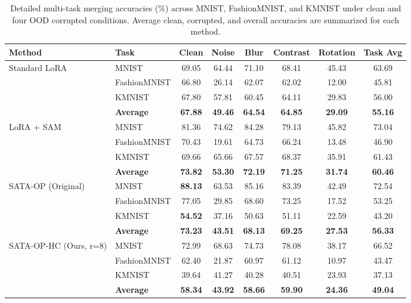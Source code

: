 \documentclass{article}
\theoremstyle{plain}
\theoremstyle{definition}
\theoremstyle{remark}
\begin{document}
\begin{table}[h]
\centering
\caption{Detailed multi-task merging accuracies (\%) across MNIST, FashionMNIST, and KMNIST under clean and four OOD corrupted conditions. Average clean, corrupted, and overall accuracies are summarized for each method.}
\label{tab:results_detailed}
\vskip 0.15in
\begin{small}
\begin{sc}
\begin{tabular}{llcccccc}
\toprule
Method & Task & Clean & Noise & Blur & Contrast & Rotation & Task Avg \\
\midrule
Standard LoRA & MNIST & 69.05 & 64.44 & 71.10 & 68.41 & 45.43 & 63.69 \\
& FashionMNIST & 66.80 & 26.14 & 62.07 & 62.02 & 12.00 & 45.81 \\
& KMNIST & 67.80 & 57.81 & 60.45 & 64.11 & 29.83 & 56.00 \\
\cmidrule{2-8}
& \textbf{Average} & \textbf{67.88} & \textbf{49.46} & \textbf{64.54} & \textbf{64.85} & \textbf{29.09} & \textbf{55.16} \\
\midrule
LoRA + SAM & MNIST & 81.36 & 74.62 & 84.28 & 79.13 & 45.82 & 73.04 \\
& FashionMNIST & 70.43 & 19.61 & 64.73 & 66.24 & 13.48 & 46.90 \\
& KMNIST & 69.66 & 65.66 & 67.57 & 68.37 & 35.91 & 61.43 \\
\cmidrule{2-8}
& \textbf{Average} & \textbf{73.82} & \textbf{53.30} & \textbf{72.19} & \textbf{71.25} & \textbf{31.74} & \textbf{60.46} \\
\midrule
SATA-OP (Original) & MNIST & \textbf{88.13} & 63.53 & 85.16 & 83.39 & 42.49 & 72.54 \\
& FashionMNIST & 77.05 & 29.85 & 68.60 & 73.25 & 17.52 & 53.25 \\
& KMNIST & \textbf{54.52} & 37.16 & 50.63 & 51.11 & 22.59 & 43.20 \\
\cmidrule{2-8}
& \textbf{Average} & \textbf{73.23} & \textbf{43.51} & \textbf{68.13} & \textbf{69.25} & \textbf{27.53} & \textbf{56.33} \\
\midrule
SATA-OP-HC (Ours, r=8) & MNIST & 72.99 & 68.63 & 74.73 & 78.08 & 38.17 & 66.52 \\
& FashionMNIST & 62.40 & 21.87 & 60.97 & 61.12 & 10.97 & 43.47 \\
& KMNIST & 39.64 & 41.27 & 40.28 & 40.51 & 23.93 & 37.13 \\
\cmidrule{2-8}
& \textbf{Average} & \textbf{58.34} & \textbf{43.92} & \textbf{58.66} & \textbf{59.90} & \textbf{24.36} & \textbf{49.04} \\

\end{tabular}
\end{sc}
\end{small}
\end{table}
\end{document}
